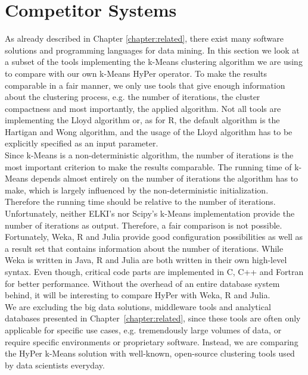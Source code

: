\section{Competitor Systems}

As already described in Chapter \ref{chapter:related}, there exist many software solutions and programming languages for data mining. In this section we look at a subset of the tools implementing the k-Means clustering algorithm we are using to compare with our own k-Means HyPer operator. To make the results comparable in a fair manner, we only use tools that give enough information about the clustering process, e.g. the number of iterations, the cluster compactness and most importantly, the applied algorithm. Not all tools are implementing the Lloyd algorithm or, as for R, the default algorithm is the Hartigan and Wong algorithm, and the usage of the Lloyd algorithm has to be explicitly specified as an input parameter.
\\
Since k-Means is a non-deterministic algorithm, the number of iterations is the most important criterion to make the results comparable. The running time of k-Means depends almost entirely on the number of iterations the algorithm has to make, which is largely influenced by the non-deterministic initialization. Therefore the running time should be relative to the number of iterations. Unfortunately, neither ELKI's nor Scipy's k-Means implementation provide the number of iterations as output. Therefore, a fair comparison is not possible. Fortunately, Weka, R and Julia provide good configuration possibilities as well as a result set that contains information about the number of iterations. While Weka is written in Java, R and Julia are both written in their own high-level syntax. Even though, critical code parts are implemented in C, C++ and Fortran for better performance. Without the overhead of an entire database system behind, it will be interesting to compare HyPer with Weka, R and Julia.
\\
We are excluding the big data solutions, middleware tools and analytical databases presented in Chapter~\ref{chapter:related}, since these tools are often only applicable for specific use cases, e.g. tremendously large volumes of data, or require specific environments or proprietary software. Instead, we are comparing the HyPer k-Means solution with well-known, open-source clustering tools used by data scientists everyday.
\\
